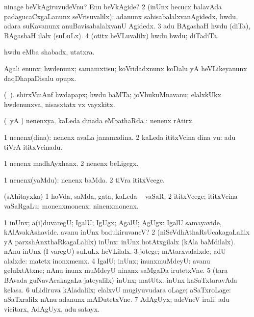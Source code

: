   ninage beVkAgiruvudeVnu? Enu beVkAgide? 
\eanum
\numie
\num{2}  (inUnx hecucx balavAda padagucaCxgaLanunx seVrisuvalilx):  adanunx sahisabalalxvanAgidedx, hwdu, adara suKavanunx anuBavisabalalxvanU Agidedx.   
\num{3}  adu BAgashaH hwdu (diTa), BAgashaH ilalx (suLuLx). 
\num{4}  (otitx heVLuvalilx) hwdu hwdu; diTadiTa.
\enum
\emng
\eentry

\bentry
{} 
\gl{\nA} 
\bmng
hwdu eMba shabadx, utatxra.
\emng

\noindent
\gl{\pagu}
\bmng
{} Agali enunx; hwdenunx; samamxtisu; koVridadxnunx koDalu yA heVLikeyanunx daqDhapaDisalu opupx.
\emng
\eentry

\bentry
{} 
\gl{\nA} 
\bmng
(\bava\ ). 
shirxVmAnf hwdapapx; hwdu baMTa; joVhukuMnavanu; elalxkUkx hwdenunxva, nisasxtatx vx vayxkitx.
\emng
\eentry

\bentry
{} 
\gl{\sapUpa} 
\bmng
(\pArxparx\ yA \kAparx) nenenxya, kaLeda dinada eMbathaRda \sapUpa:  nenenx  rAtirx.
\emng
\eentry

\bentry
{} 
\gl{\nA} 
\bmng
\bnum
\num{1} nenenx(dina):  nenenx avaLa janamxdina. 
\num{2} kaLeda ititxVcina dina \mo vu:   adu tiVrA ititxVcinadu.
\enum
\emng 

\noindent
\gl{\pagu}
\bmng
\bnum
\num{1}  nenenx madhAyxhanx. 
\num{2}  nenenx beLigegx.
\enum
\emng
\eentry

\bentry
{} 
\gl{\kirxvi} 
\bmng
\bnum
\num{1} nenenx(yaMdu):   nenenx baMda. 
\num{2} tiVra ititxVcege.
\enum
\emng
\eentry

\bentry
{} 
\gl{\nA} 
\bmng
(sAhitayxka) 
\bnum
\num{1} hoVda, saMda, gata, kaLeda -- vaSaR. 
\num{2} ititxVcege; ititxVcina vaSaRgaLu; monenxmonenx; ninenxmonenx.
\enum
\emng
\eentry

\bentry
{} 
\gl{\kirxvi} 
\bmng
\bnum
\num{1} inUnx; a(i)duvaregU; IgalU; IgUgx; AgalU; AgUgx:  IgalU samayavide, kAlAvakAshavide.  avanu inUnx badukiruvaneV?
\num{2} (niSeVdhAthaRsUcakagaLalilx yA parxshAnxthaRkagaLalilx) inUnx:  inUnx hotAtxgilalx (kAla baMdilalx).   nAnu inUnx (I varegU) suLuLx heVLilalx. 
\num{3}  jotege; mAtarxvalalxde; adU alalxde:  matetx inonxmemx. 
\num{4} IgalU; inUnx; inunxmuMdeyU:  avanu gelulxtAtxne; nAnu inunx muMdeyU ninanx saMgaDa irutetxVne. 
\num{5} (tara BAvada guNavAcakagaLa jateyalilx) inUnx; matUtx:  inUnx kaSaTxtaravAda kelasa.  
\num{6} uLidiruva kAladalilx; elalxvU mugiyuvudara oLage; aSaTxroLage:  aSaTxralilx nAnu adanunx mADutetxVne. 
\num{7} AdAgUyx; adeVneV irali: adu vicitarx, AdAgUyx, adu satayx.
\enum
\emng

